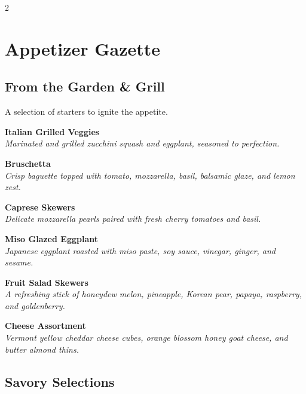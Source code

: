 \documentclass[a4paper,10pt]{article}
\newcommand{\veg}{\raisebox{-1pt}{\large\textleaf} }
\begin{document}
\begin{multicols}{2}

    \section{Appetizer Gazette}
    \vspace{0.2cm}

    \subsection{From the Garden & Grill}
    A selection of starters to ignite the appetite.

    \vspace{0.2cm}
    \textbf{Italian Grilled Veggies} \veg \\
    \textit{Marinated and grilled zucchini squash and eggplant, seasoned to perfection.}

    \vspace{0.1cm}
    \textbf{Bruschetta} \veg \\
    \textit{Crisp baguette topped with tomato, mozzarella, basil, balsamic glaze, and lemon zest.}

    \vspace{0.1cm}
    \textbf{Caprese Skewers} \veg \\
    \textit{Delicate mozzarella pearls paired with fresh cherry tomatoes and basil.}

    \vspace{0.1cm}
    \textbf{Miso Glazed Eggplant} \veg \\
    \textit{Japanese eggplant roasted with miso paste, soy sauce, vinegar, ginger, and sesame.}

    \vspace{0.1cm}
    \textbf{Fruit Salad Skewers} \veg \\
    \textit{A refreshing stick of honeydew melon, pineapple, Korean pear, papaya, raspberry, and goldenberry.}

    \vspace{0.1cm}
    \textbf{Cheese Assortment} \veg \\
    \textit{Vermont yellow cheddar cheese cubes, orange blossom honey goat cheese, and butter almond thins.}

    \vspace{0.2cm}
    \subsection{Savory Selections}


\end{multicols}
\end{document}
